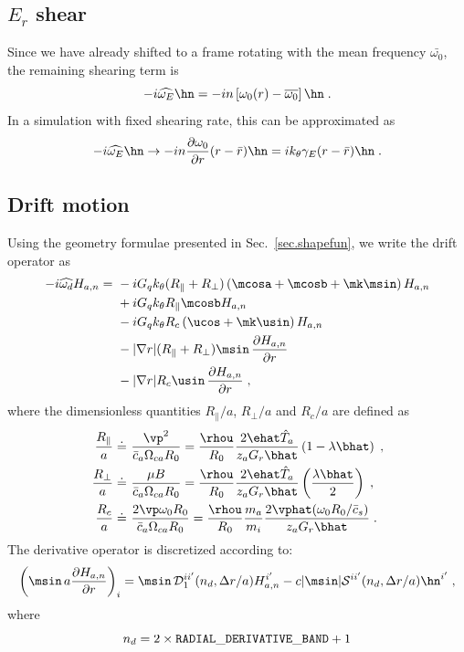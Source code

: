 \subsection{$E_r$ shear}

Since we have already shifted to a frame rotating with the
mean frequency $\bar{\omega_0}$, the remaining shearing term is
%
\begin{equation}
-i \widehat{\omega_E} \hn = -i n \left[ \omega_0(r)-\overline{\omega_0} 
\right] \hn \; .
\end{equation}
%
In a simulation with fixed shearing rate, this can be approximated as  
%
\begin{equation}
-i \widehat{\omega_E} \hn  \rightarrow 
 -i n \frac{\partial\omega_0}{\partial r} (r-\bar{r}) \hn = 
 i k_\theta \gamma_E (r-\bar{r}) \hn \; .
\end{equation}

\subsection{Drift motion}

Using the geometry formulae presented in Sec.~\ref{sec.shapefun}, we write
the drift operator as
%
\begin{align}
-i \widehat{\omega_d} H_{a,n} = &~
- i G_q k_\theta (R_\parallel + R_\perp) \left( \mcosa + \mcosb + 
 \mk \msin \right) H_{a,n} \\
&~ + i G_q k_\theta R_\parallel \mcosb H_{a,n} \\
&~ - i G_q k_\theta R_c \left( \ucos + \mk \usin \right) H_{a,n} \\
&~ - | \nabla r | (R_\parallel + R_\perp) \msin 
 \, \frac{\partial H_{a,n}}{\partial r} \\
&~ - | \nabla r | R_c \usin  \, \frac{\partial H_{a,n}}{\partial r} \; ,
\end{align}
%
where the dimensionless quantities $R_\parallel/a$, $R_\perp/a$ and 
$R_c/a$ are defined as
%
\begin{align}
\frac{R_\parallel}{a} \doteq 
 &~\frac{\vp^2}{\bar{c}_a \Omega_{ca} R_0} 
= \frac{\rhou}{R_0} \frac{2 \ehat \hat{T}_a}{z_a G_r \bhat} 
 \left(1-\lambda \bhat \right) \; , \\
\frac{R_\perp}{a} \doteq 
 &~\frac{\mu B}{\bar{c}_a \Omega_{ca} R_0} 
= \frac{\rhou}{R_0} \frac{2 \ehat \hat{T}_a}{z_a G_r \bhat} 
 \left( \frac{\lambda \bhat}{2} \right) \; , \\ 
\frac{R_c}{a} \doteq 
 &~\frac{2 \vp \omega_0 R_0}{\bar{c}_a \Omega_{ca} R_0} 
= \frac{\rhou}{R_0} \frac{m_a}{m_i} 
\frac{2 \vphat(\omega_0 R_0/\bar{c}_s)}{z_a G_r \bhat} \; . 
\end{align}
%
The derivative operator is discretized according to:
%
\begin{equation}
\left( \msin \, a \frac{\partial H_{a,n}}{\partial r} \right)_i =
\msin \, {\cal D}_1^{ii^\prime}(n_d,\Delta r/a) H_{a,n}^{i^\prime} 
 - c |\msin| {\cal S}^{ii^\prime}(n_d,\Delta r/a) \hn^{i^\prime} \; ,
\end{equation}
%
where
%
\begin{equation}
n_d = 2 \times {\tt RADIAL\_DERIVATIVE\_BAND} + 1
\end{equation}


